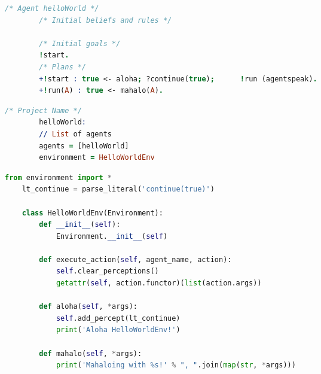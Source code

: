 \documentclass[a0,portrait]{a0poster}
\begin{document}
\begin{multicols}{2}
\vspace{13mm}
\noindent\begin{minipage}{.235\textwidth}
	\begin{minipage}{\textwidth}
		\lstset{style=codeStyle}
		\begin{lstlisting}[language=Prolog, label={alg:exemplo-hello-world}, caption={Exemplo de programa em AgentSpeak(L).}]
		/* Agent helloWorld */
		/* Initial beliefs and rules */

		/* Initial goals */
		!start.
		/* Plans */
		+!start : true <- aloha; ?continue(true);      !run (agentspeak).
		+!run(A) : true <- mahalo(A).
		\end{lstlisting}
	\end{minipage}\hfill
	\vspace{7mm}

	\begin{minipage}{\textwidth}
		\lstset{style=codeStyle}
		\begin{lstlisting}[language=Prolog, label={alg:exemplo-projeto-hello-world}, caption={Exemplo de projeto do AgentSpeak(Py).}]
		/* Project Name */
		helloWorld:
		// List of agents
		agents = [helloWorld]
		environment = HelloWorldEnv
		\end{lstlisting}
	\end{minipage}\hfill
\end{minipage}\hfill
\begin{minipage}{.235\textwidth}
	\lstset{style=codeStyle}
	\begin{lstlisting}[language=Python, label={alg:exemplo-environment}, caption={Exemplo da descrição do ambiente em Python.}]
	from environment import *
	lt_continue = parse_literal('continue(true)')

	class HelloWorldEnv(Environment):
		def __init__(self):
			Environment.__init__(self)

		def execute_action(self, agent_name, action):
			self.clear_perceptions()
			getattr(self, action.functor)(list(action.args))

		def aloha(self, *args):
			self.add_percept(lt_continue)
			print('Aloha HelloWorldEnv!')

		def mahalo(self, *args):
			print('Mahaloing with %s!' % ", ".join(map(str, *args)))
	\end{lstlisting}
\end{minipage}

\color{NavyBlue}

\end{multicols}
\end{document}
